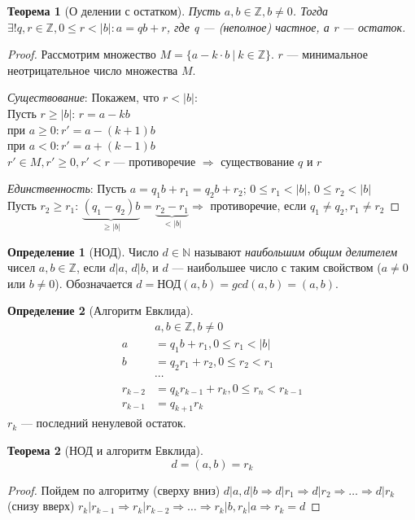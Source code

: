 \documentclass[a4paper]{article}
\theoremstyle{definition}
\newtheorem{definition}{Определение}
\theoremstyle{plain}
\newtheorem{theorem}{Теорема}
\begin{document}
\begin{theorem}[О делении с остатком]
  Пусть $a, b \in \mathbb{Z}, b \neq 0$.
  Тогда $\exists! q, r \in \mathbb{Z}, 0 \leq r < |b|: a = qb+r$, где q --- (неполное) частное, а r --- остаток.
\end{theorem}
\begin{proof}
  Рассмотрим множество $M = \{a - k \cdot b\ |\ k \in \mathbb{Z}\}$.
  $r$ --- минимальное неотрицательное число множества $M$.

  \emph{Существование}:
  Покажем, что $r < |b|$:\\
  Пусть $r \geq |b|$: $r = a - kb$\\
  при $a \geq 0: r' = a - (k + 1)b$ \\
  при $a < 0: r' = a + (k - 1)b$\\
  $r' \in M, r' \geq 0, r' < r$ --- противоречие $\Rightarrow$ существование $q$ и $r$

  \emph{Единственность}:
  Пусть $a = q_{1}b + r_{1} = q_{2}b + r_{2}$;
  $0 \leq r_{1} < |b|$, $0 \leq r_{2} < |b|$\\
  Пусть $r_{2} \geq r_{1}$: $\underbrace{(q_{1} - q_{2})b}_{\geq |b|} = \underbrace{r_{2} - r_{1}}_{< |b|} \Rightarrow$ противоречие, если $q_{1} \neq q_{2}, r_{1} \neq r_{2}$
\end{proof}

\begin{definition}[НОД]
Число $d \in \mathbb{N}$ называют \emph{наибольшим общим делителем} чисел $a, b \in \mathbb{Z}$, если $d|a$, $d|b$, и $d$ --- наибольшее число с таким свойством ($a \neq 0$ или $b \neq 0$).
Обозначается $d = \text{НОД}(a, b) = gcd(a, b) = (a, b)$.
\end{definition}

\begin{definition}[Алгоритм Евклида]
  \begin{align*}
    &a, b \in \mathbb{Z}, b \neq 0\\
    a &= q_{1}b+r_{1}, 0 \leq r_{1} < |b|\\
    b &= q_{2}r_{1}+r_{2}, 0 \leq r_{2} < r_{1}\\
    &\cdots\\
    r_{k-2} &= q_{k}r_{k-1}+r_{k}, 0 \leq r_{n} < r_{k-1}\\
    r_{k-1} &= q_{k+1} r_{k}
  \end{align*}
  $r_{k}$ --- последний ненулевой остаток.
\end{definition}

\begin{theorem}[НОД и алгоритм Евклида]
  \begin{equation*}
    d = (a, b) = r_{k}
  \end{equation*}
\end{theorem}
\begin{proof}
  Пойдем по алгоритму (сверху вниз)
  $d | a, d | b \Rightarrow d | r_{1} \Rightarrow d | r_{2} \Rightarrow \ldots \Rightarrow d | r_{k}$\\
  (снизу вверх) $r_{k}|r_{k-1} \Rightarrow r_{k}|r_{k-2} \Rightarrow \ldots \Rightarrow r_{k}|b, r_{k}|a \Rightarrow r_{k} = d$
\end{proof}
\end{document}
